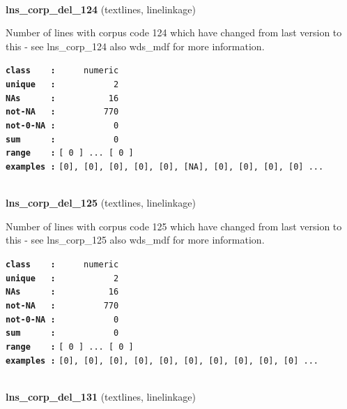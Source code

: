 \documentclass[]{article}
\begin{document}
~

\textbf{lns\_corp\_del\_124} (textlines, linelinkage)

Number of lines with corpus code 124 which have changed from last
version to this - see lns\_corp\_124 also wds\_mdf for more information.

\textbf{\texttt{class\ \ \ \ :}} \texttt{~~~~~numeric}\\
\textbf{\texttt{unique\ \ \ :}} \texttt{~~~~~~~~~~~2}\\
\textbf{\texttt{NAs\ \ \ \ \ \ :}} \texttt{~~~~~~~~~~16}\\
\textbf{\texttt{not-NA\ \ \ :}} \texttt{~~~~~~~~~770}\\
\textbf{\texttt{not-0-NA\ :}} \texttt{~~~~~~~~~~~0}\\
\textbf{\texttt{sum\ \ \ \ \ \ :}} \texttt{~~~~~~~~~~~0}\\
\textbf{\texttt{range\ \ \ \ :}}
\texttt{{[}\ 0\ {]}\ ...\ {[}\ 0\ {]}}\\
\textbf{\texttt{examples\ :}}
\texttt{{[}0{]},\ {[}0{]},\ {[}0{]},\ {[}0{]},\ {[}0{]},\ {[}NA{]},\ {[}0{]},\ {[}0{]},\ {[}0{]},\ {[}0{]}\ ...}\\

~

\textbf{lns\_corp\_del\_125} (textlines, linelinkage)

Number of lines with corpus code 125 which have changed from last
version to this - see lns\_corp\_125 also wds\_mdf for more information.

\textbf{\texttt{class\ \ \ \ :}} \texttt{~~~~~numeric}\\
\textbf{\texttt{unique\ \ \ :}} \texttt{~~~~~~~~~~~2}\\
\textbf{\texttt{NAs\ \ \ \ \ \ :}} \texttt{~~~~~~~~~~16}\\
\textbf{\texttt{not-NA\ \ \ :}} \texttt{~~~~~~~~~770}\\
\textbf{\texttt{not-0-NA\ :}} \texttt{~~~~~~~~~~~0}\\
\textbf{\texttt{sum\ \ \ \ \ \ :}} \texttt{~~~~~~~~~~~0}\\
\textbf{\texttt{range\ \ \ \ :}}
\texttt{{[}\ 0\ {]}\ ...\ {[}\ 0\ {]}}\\
\textbf{\texttt{examples\ :}}
\texttt{{[}0{]},\ {[}0{]},\ {[}0{]},\ {[}0{]},\ {[}0{]},\ {[}0{]},\ {[}0{]},\ {[}0{]},\ {[}0{]},\ {[}0{]}\ ...}\\

~

\textbf{lns\_corp\_del\_131} (textlines, linelinkage)
\end{document}
